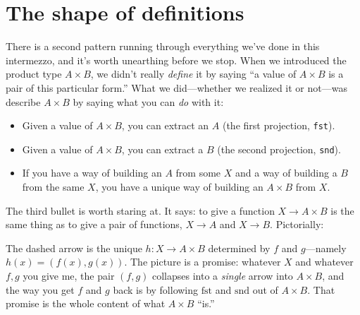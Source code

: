 \documentclass[11pt]{article}
\begin{document}
\section{The shape of definitions}

There is a second pattern running through everything we've done in this intermezzo, and it's worth unearthing before we stop. When we introduced the product type $A \times B$, we didn't really \emph{define} it by saying ``a value of $A \times B$ is a pair of this particular form.'' What we did---whether we realized it or not---was describe $A \times B$ by saying what you can \emph{do} with it:

\begin{itemize}
  \item Given a value of $A \times B$, you can extract an $A$ (the first projection, \texttt{fst}).
  \item Given a value of $A \times B$, you can extract a $B$ (the second projection, \texttt{snd}).
  \item If you have a way of building an $A$ from some $X$ and a way of building a $B$ from the same $X$, you have a unique way of building an $A \times B$ from $X$.
\end{itemize}

The third bullet is worth staring at. It says: to give a function $X \to A \times B$ is the same thing as to give a pair of functions, $X \to A$ and $X \to B$. Pictorially:

\begin{center}
\end{center}

The dashed arrow is the unique $h : X \to A \times B$ determined by $f$ and $g$---namely $h(x) = (f(x), g(x))$. The picture is a promise: whatever $X$ and whatever $f, g$ you give me, the pair $(f, g)$ collapses into a \emph{single} arrow into $A \times B$, and the way you get $f$ and $g$ back is by following $\mathrm{fst}$ and $\mathrm{snd}$ out of $A \times B$. That promise is the whole content of what $A \times B$ ``is.''
\end{document}
